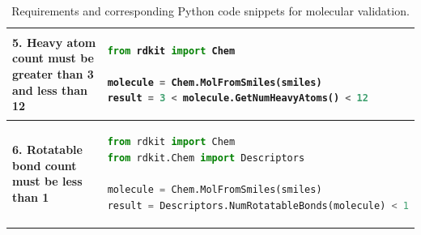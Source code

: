 \documentclass[10pt]{article} %
\begin{document}
\begin{table}[H]
\begin{tabular}{|p{}|p{}|}
            \textbf{5. Heavy atom count must be greater than 3 and less than 12} &
            \begin{lstlisting}[language=Python]
from rdkit import Chem

molecule = Chem.MolFromSmiles(smiles)
result = 3 < molecule.GetNumHeavyAtoms() < 12
            \end{lstlisting} \\
            \hline

            \textbf{6. Rotatable bond count must be less than 1} &
            \begin{lstlisting}[language=Python]
from rdkit import Chem
from rdkit.Chem import Descriptors

molecule = Chem.MolFromSmiles(smiles)
result = Descriptors.NumRotatableBonds(molecule) < 1
            \end{lstlisting} \\
            \hline
        \end{tabular}
        \caption{Requirements and corresponding Python code snippets for molecular validation.}
        \label{tab:requirements}
    \end{table}
\end{document}
